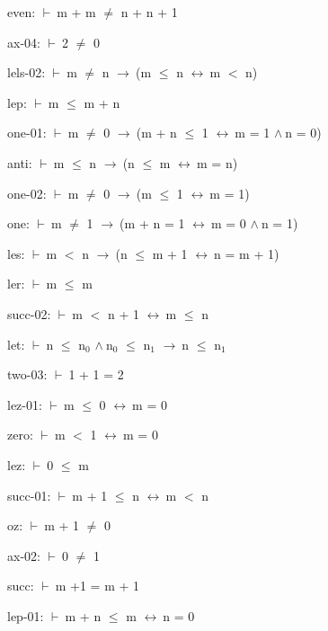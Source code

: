 \documentclass[a4paper]{article}
\newcommand{\Fol}{\mbox{$\vdash\ $}}
\newcommand{\And}{\mbox{$\wedge\ $}}
\newcommand{\Imp}{\mbox{$\rightarrow\ $}}
\newcommand{\Equiv}{\mbox{$\leftrightarrow\ $}}
\begin{document}
even: 
 \Fol m + m $\neq$ n + n + 1



ax-04: 
 \Fol 2 $\neq$ 0



lels-02: 
 \Fol m $\neq$ n \Imp (m $\le$ n \Equiv m $<$ n)



lep: 
 \Fol m $\le$ m + n



one-01: 
 \Fol m $\neq$ 0 \Imp (m + n $\le$ 1 \Equiv m = 1 \And n = 0)



anti: 
 \Fol m $\le$ n \Imp (n $\le$ m \Equiv m = n)



one-02: 
 \Fol m $\neq$ 0 \Imp (m $\le$ 1 \Equiv m = 1)



one: 
 \Fol m $\neq$ 1 \Imp (m + n = 1 \Equiv m = 0 \And n = 1)



les: 
 \Fol m $<$ n \Imp (n $\le$ m + 1 \Equiv n = m + 1)



ler: 
 \Fol m $\le$ m



succ-02: 
 \Fol m $<$ n + 1 \Equiv m $\le$ n



let: 
 \Fol n $\le$ $\mbox{n}_{0}$ \And $\mbox{n}_{0}$ $\le$ $\mbox{n}_{1}$ \Imp n $\le$ $\mbox{n}_{1}$



two-03: 
 \Fol 1 + 1 = 2



lez-01: 
 \Fol m $\le$ 0 \Equiv m = 0



zero: 
 \Fol m $<$ 1 \Equiv m = 0



lez: 
 \Fol 0 $\le$ m



succ-01: 
 \Fol m + 1 $\le$ n \Equiv m $<$ n



oz: 
 \Fol m + 1 $\neq$ 0



ax-02: 
 \Fol 0 $\neq$ 1



succ: 
 \Fol m +1 = m + 1



lep-01: 
 \Fol m + n $\le$ m \Equiv n = 0
\end{document}

